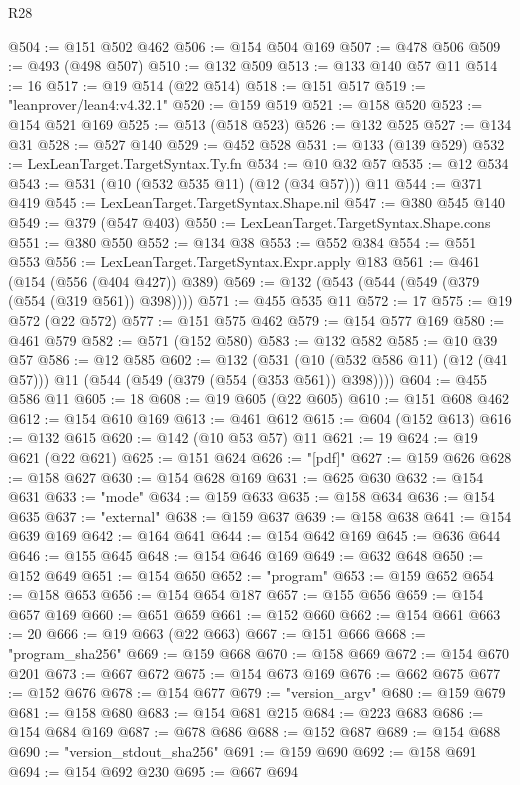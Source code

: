 \begin{lexlean}{R28}
\begin{coremodule}
@504 := @151 @502 @462
@506 := @154 @504 @169
@507 := @478 @506
@509 := @493 (@498 @507)
@510 := @132 @509
@513 := @133 @140 @57 @11
@514 := 16
@517 := @19 @514 (@22 @514)
@518 := @151 @517
@519 := "leanprover/lean4:v4.32.1"
@520 := @159 @519
@521 := @158 @520
@523 := @154 @521 @169
@525 := @513 (@518 @523)
@526 := @132 @525
@527 := @134 @31
@528 := @527 @140
@529 := @452 @528
@531 := @133 (@139 @529)
@532 := LexLeanTarget.TargetSyntax.Ty.fn
@534 := @10 @32 @57
@535 := @12 @534
@543 := @531 (@10 (@532 @535 @11) (@12 (@34 @57))) @11
@544 := @371 @419
@545 := LexLeanTarget.TargetSyntax.Shape.nil
@547 := @380 @545 @140
@549 := @379 (@547 @403)
@550 := LexLeanTarget.TargetSyntax.Shape.cons
@551 := @380 @550
@552 := @134 @38
@553 := @552 @384
@554 := @551 @553
@556 := LexLeanTarget.TargetSyntax.Expr.apply @183
@561 := @461 (@154 (@556 (@404 @427)) @389)
@569 := @132 (@543 (@544 (@549 (@379 (@554 (@319 @561)) @398))))
@571 := @455 @535 @11
@572 := 17
@575 := @19 @572 (@22 @572)
@577 := @151 @575 @462
@579 := @154 @577 @169
@580 := @461 @579
@582 := @571 (@152 @580)
@583 := @132 @582
@585 := @10 @39 @57
@586 := @12 @585
@602 := @132
    (@531 (@10 (@532 @586 @11) (@12 (@41 @57))) @11 (@544 (@549 (@379 (@554 (@353 @561)) @398))))
@604 := @455 @586 @11
@605 := 18
@608 := @19 @605 (@22 @605)
@610 := @151 @608 @462
@612 := @154 @610 @169
@613 := @461 @612
@615 := @604 (@152 @613)
@616 := @132 @615
@620 := @142 (@10 @53 @57) @11
@621 := 19
@624 := @19 @621 (@22 @621)
@625 := @151 @624
@626 := "[pdf]"
@627 := @159 @626
@628 := @158 @627
@630 := @154 @628 @169
@631 := @625 @630
@632 := @154 @631
@633 := "mode"
@634 := @159 @633
@635 := @158 @634
@636 := @154 @635
@637 := "external"
@638 := @159 @637
@639 := @158 @638
@641 := @154 @639 @169
@642 := @164 @641
@644 := @154 @642 @169
@645 := @636 @644
@646 := @155 @645
@648 := @154 @646 @169
@649 := @632 @648
@650 := @152 @649
@651 := @154 @650
@652 := "program"
@653 := @159 @652
@654 := @158 @653
@656 := @154 @654 @187
@657 := @155 @656
@659 := @154 @657 @169
@660 := @651 @659
@661 := @152 @660
@662 := @154 @661
@663 := 20
@666 := @19 @663 (@22 @663)
@667 := @151 @666
@668 := "program_sha256"
@669 := @159 @668
@670 := @158 @669
@672 := @154 @670 @201
@673 := @667 @672
@675 := @154 @673 @169
@676 := @662 @675
@677 := @152 @676
@678 := @154 @677
@679 := "version_argv"
@680 := @159 @679
@681 := @158 @680
@683 := @154 @681 @215
@684 := @223 @683
@686 := @154 @684 @169
@687 := @678 @686
@688 := @152 @687
@689 := @154 @688
@690 := "version_stdout_sha256"
@691 := @159 @690
@692 := @158 @691
@694 := @154 @692 @230
@695 := @667 @694

\end{coremodule}
\end{lexlean}
